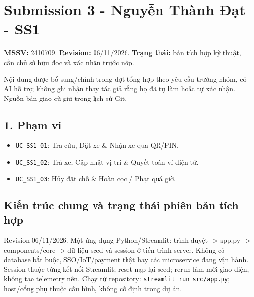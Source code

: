 \documentclass[11pt,a4paper]{article}
\providecommand{\tightlist}{%
  \setlength{\itemsep}{0pt}\setlength{\parskip}{0pt}}
\begin{document}
\setcounter{page}{1}
\tableofcontents
\newpage

\hypertarget{submission-3---nguyux1ec5n-thuxe0nh-ux111ux1ea1t---ss1}{%
\section{Submission 3 - Nguyễn Thành Đạt -
SS1}\label{submission-3---nguyux1ec5n-thuxe0nh-ux111ux1ea1t---ss1}}

\textbf{MSSV:} 2410709. \textbf{Revision:} 06/11/2026. \textbf{Trạng
thái:} bản tích hợp kỹ thuật, cần chủ sở hữu đọc và xác nhận trước nộp.

Nội dung được bổ sung/chỉnh trong đợt tổng hợp theo yêu cầu trưởng nhóm,
có AI hỗ trợ; không ghi nhận thay tác giả rằng họ đã tự làm hoặc tự xác
nhận. Nguồn bàn giao cũ giữ trong lịch sử Git.

\hypertarget{phux1ea1m-vi}{%
\subsection{1. Phạm vi}\label{phux1ea1m-vi}}

\begin{itemize}
\tightlist
\item
  \texttt{UC\_SS1\_01}: Tra cứu, Đặt xe \& Nhận xe qua QR/PIN.
\item
  \texttt{UC\_SS1\_02}: Trả xe, Cập nhật vị trí \& Quyết toán ví điện
  tử.
\item
  \texttt{UC\_SS1\_03}: Hủy đặt chỗ \& Hoàn cọc / Phạt quá giờ.
\end{itemize}

\hypertarget{kiux1ebfn-truxfac-chung-vuxe0-trux1ea1ng-thuxe1i-phiuxean-bux1ea3n-tuxedch-hux1ee3p}{%
\subsection{Kiến trúc chung và trạng thái phiên bản tích
hợp}\label{kiux1ebfn-truxfac-chung-vuxe0-trux1ea1ng-thuxe1i-phiuxean-bux1ea3n-tuxedch-hux1ee3p}}

Revision 06/11/2026. Một ứng dụng Python/Streamlit: trình duyệt
-\textgreater{} app.py -\textgreater{} components/core -\textgreater{}
dữ liệu seed và session ở tiến trình server. Không có database bắt buộc,
SSO/IoT/payment thật hay các microservice đang vận hành. Session thuộc
từng kết nối Streamlit; reset nạp lại seed; rerun làm mới giao diện,
không tạo telemetry nền. Chạy từ repository:
\texttt{streamlit\ run\ src/app.py}; host/cổng phụ thuộc cấu hình, không
cố định trong dự án.
\end{document}
